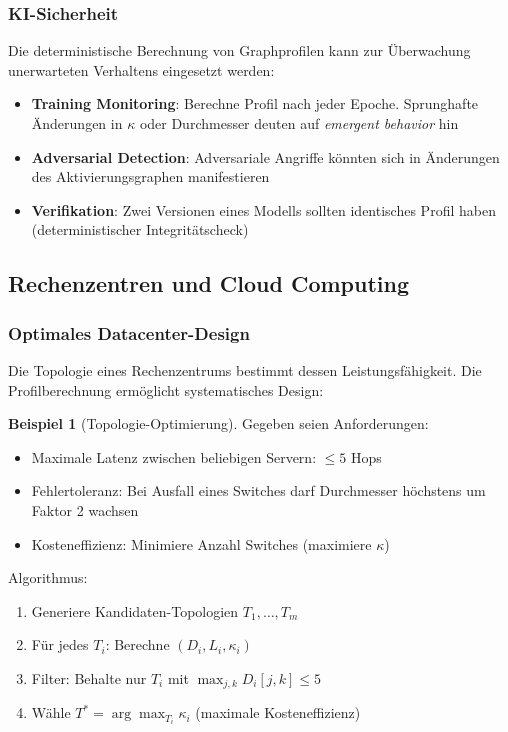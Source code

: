 ﻿\documentclass[a4paper,12pt]{article}
\theoremstyle{definition}
\newtheorem{beispiel}{Beispiel}
\begin{document}
	\subsubsection{KI-Sicherheit}
	
	Die deterministische Berechnung von Graphprofilen kann zur Überwachung unerwarteten Verhaltens eingesetzt werden:
	
	\begin{itemize}
		\item[-] \textbf{Training Monitoring}: Berechne Profil nach jeder Epoche. Sprunghafte Änderungen in $\kappa$ oder Durchmesser deuten auf \textit{emergent behavior} hin
		\item[-] \textbf{Adversarial Detection}: Adversariale Angriffe könnten sich in Änderungen des Aktivierungsgraphen manifestieren
		\item[-] \textbf{Verifikation}: Zwei Versionen eines Modells sollten identisches Profil haben (deterministischer Integritätscheck)
	\end{itemize}
	
	\subsection{Rechenzentren und Cloud Computing}
	
	\subsubsection{Optimales Datacenter-Design}
	
	Die Topologie eines Rechenzentrums bestimmt dessen Leistungsfähigkeit. Die Profilberechnung ermöglicht systematisches Design:
	
	\begin{beispiel}[Topologie-Optimierung]
		Gegeben seien Anforderungen:
		\begin{itemize}
			\item[-] Maximale Latenz zwischen beliebigen Servern: $\leq 5$ Hops
			\item[-] Fehlertoleranz: Bei Ausfall eines Switches darf Durchmesser höchstens um Faktor 2 wachsen
			\item[-] Kosteneffizienz: Minimiere Anzahl Switches (maximiere $\kappa$)
		\end{itemize}
		
		Algorithmus:
		\begin{enumerate}
			\item Generiere Kandidaten-Topologien $T_1, \ldots, T_m$
			\item Für jedes $T_i$: Berechne $(D_i, L_i, \kappa_i)$
			\item Filter: Behalte nur $T_i$ mit $\max_{j,k} D_i[j,k] \leq 5$
			\item Wähle $T^* = \arg\max_{T_i} \kappa_i$ (maximale Kosteneffizienz)
		\end{enumerate}
	\end{beispiel}
	
\end{document}
